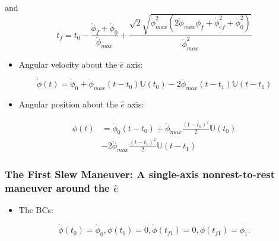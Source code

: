 \documentclass[letterpaper, preprint, paper,11pt]{AAS}	%
\begin{document}
	
	and
	\begin{equation}
	t_f=t_0-\frac{\dot{\phi}_{f}+\dot{\phi}_{0}}{\ddot{\phi}_{max}}+\frac{\sqrt{2}\sqrt{\ddot{\phi}_{max}^2(2\ddot{\phi}_{max}\phi_{f}+\dot{\phi}_{ef}^2+\dot{\phi}_{0}^2)}}{\ddot{\phi}_{max}^2}
	\end{equation}
	\begin{itemize}
		\item Angular velocity about the $\hat{e}$ axis:
	\end{itemize}
	\begin{equation}\label{omega}
	\dot{\phi}(t)=\dot{\phi}_{0}+\ddot{\phi}_{max}(t-t_0)\mathbb{U}(t_0)- 2\ddot{\phi}_{max}(t-t_1)\mathbb{U}(t-t_1)
	\end{equation}
	\begin{itemize}
		\item Angular position about the $\hat{e}$ axis:
	\end{itemize}
	\begin{equation}\label{phi}
	\begin{split}
	\phi(t)&=\dot{\phi}_{0}(t-t_0)+\ddot{\phi}_{max}\frac{(t-t_0)^2}{2}\mathbb{U}(t_0)\\
	&- 2\ddot{\phi}_{max}\frac{(t-t_1)^2}{2}\mathbb{U}(t-t_1)
	\end{split}
	\end{equation}
	
	
	\subsubsection{The First Slew Maneuver: A single-axis nonrest-to-rest maneuver around the $\hat{e}$}
	
	\begin{itemize}
		\item The BCs: 
	\end{itemize}
	\begin{equation}\label{Bc1}
	\dot{\phi}(t_0)=\dot{\phi}_{0},\phi(t_0)=0, \dot{\phi}(t_{f1})=0,\phi(t_{f1})=\phi_1.
	\end{equation}
	
\end{document}
